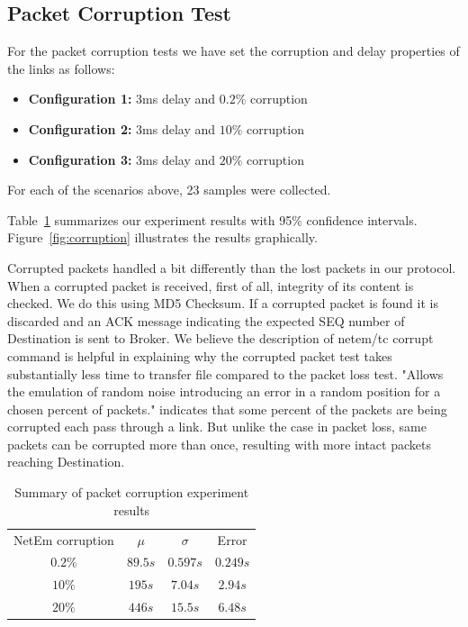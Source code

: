 \documentclass[conference]{IEEEtran}
\begin{document}
\subsection{Packet Corruption Test}\label{AA}

For the packet corruption tests we have set the corruption and delay properties of the links as follows:
\begin{itemize}
    \item \textbf{Configuration 1:} 3ms delay and $0.2\%$ corruption
    \item \textbf{Configuration 2:} 3ms delay and $10\%$ corruption
    \item \textbf{Configuration 3:} 3ms delay and $20\%$ corruption
\end{itemize}
For each of the scenarios above, 23 samples were collected.

Table~\ref{table:corruption} summarizes our experiment results with 95\% confidence intervals.
Figure~\ref{fig:corruption} illustrates the results graphically.

Corrupted packets handled a bit differently than the lost packets in our protocol. When a corrupted packet is received, first of all, integrity of its content is checked. We do this using MD5 Checksum. If a corrupted packet is found it is discarded and an ACK message indicating the expected SEQ number of Destination is sent to Broker. We believe the description of netem/tc corrupt command is helpful in explaining why the corrupted packet test takes substantially less time to transfer file compared to the packet loss test. "Allows the emulation of random noise introducing an error in a random position for a chosen percent  of packets." indicates that some percent of the packets are being corrupted each pass through a link. But unlike the case in packet loss, same packets can be corrupted more than once, resulting with more intact packets reaching Destination.

\begin{table}
    \centering
    \begin{tabular}{c c c c}
        \toprule
        NetEm corruption & $\mu$ & $\sigma$ & Error \\
        $0.2\%$   &   $89.5s$   &   $0.597s$    &   $0.249s$ \\
        $10\%$   &    $195s$   &   $7.04s$    &   $2.94s$ \\
        $20\%$   &    $446s$   &   $15.5s$    &   $6.48s$ \\
        \bottomrule
    \end{tabular}\label{table:corruption} \\
    \caption{Summary of packet corruption experiment results}\label{table:corruption}
\end{table}
\end{document}
